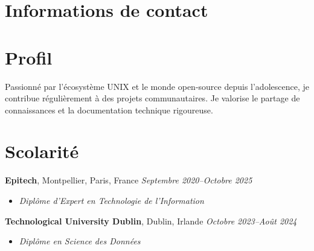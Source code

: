 \documentclass[margin,line]{../res}
\begin{document}
\newcommand{\myname}{Théo BORI}
\newlength{\mynamewidth}
\settowidth{\mynamewidth}{\namefont\myname}

\name{\hspace*{0.5\textwidth}\hspace{-0.5\mynamewidth} \myname \vspace*{.1in}}
\thispagestyle{empty}

\begin{resume}

  \section{\sc Informations de contact}
  

  \vspace{-1em}

  \section{\sc Profil}
  Passionné par l'écosystème UNIX et le monde open-source depuis
  l'adolescence, je contribue régulièrement à des projets
  communautaires. Je valorise le partage de connaissances et la
  documentation technique rigoureuse.

  \section{\sc Scolarité}
  {\bf Epitech}, Montpellier, Paris, France
  \hfill {\it Septembre 2020--Octobre 2025}
  \vspace*{.05in}
  \begin{itemize}
    \item {\it Diplôme d'Expert en Technologie de l'Information}
  \end{itemize}

  {\bf Technological University Dublin}, Dublin, Irlande
  \hfill {\it Octobre 2023--Août 2024}
  \vspace*{.05in}
  \begin{itemize}
    \item {\it Diplôme en Science des Données}
  \end{itemize}


\end{resume}
\end{document}
